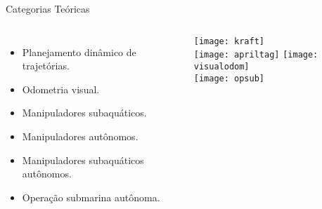 \begin{frame}[c]{Categorias Teóricas}
    \centering
    \begin{columns}
        \begin{itemize}
            \item Planejamento dinâmico de trajetórias.
            \item Odometria visual.
            \item Manipuladores subaquáticos.
            \item Manipuladores autônomos.
            \item Manipuladores subaquáticos autônomos.
            \item Operação submarina autônoma.
        \end{itemize}
            \centering
            \texttt{[image: kraft]}\\
            \texttt{[image: apriltag]}
            \centering
            \texttt{[image: visualodom]}\\
            \texttt{[image: opsub]}


\end{columns}
\end{frame}
